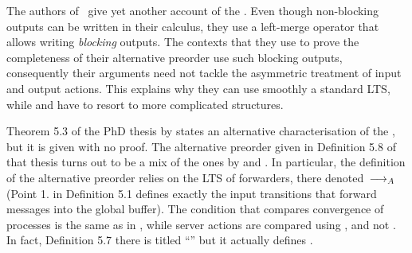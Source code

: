 



The authors of~\cite{DBLP:journals/tcs/NicolaP00} give yet another account of the \mustpreorder.
Even though non-blocking outputs can be written in their calculus,
they use a left-merge operator that allows writing {\em blocking} outputs.
The contexts that they use to prove the completeness of their
alternative preorder use such blocking outputs, consequently
their arguments need not tackle the asymmetric treatment of input and
output actions. This explains why they can use smoothly a standard
LTS, while \cite{DBLP:conf/fsttcs/CastellaniH98} and
\cite{DBLP:journals/iandc/BorealeNP02} have to resort to more
complicated structures.


Theorem 5.3 of the PhD thesis by \cite{DBLP:phd/us/Thati03} states an
alternative characterisation of the \mustpreorder, but it is given
with no proof.  The alternative preorder given in Definition 5.8 of
that thesis turns out to be a mix of the ones by
\cite{DBLP:conf/fsttcs/CastellaniH98} and
\cite{DBLP:journals/iandc/BorealeNP02}.  In particular, the
definition of the alternative preorder relies on the LTS of
forwarders, there denoted~$\mathrel{\overset{}\longrightarrow}_A$ (Point 1. in Definition 5.1
defines exactly the input transitions that forward messages into the
global buffer).  The condition that compares convergence of processes
is the same as in \cite{DBLP:conf/fsttcs/CastellaniH98}, while
server actions are compared using \MustSets, and not \AcceptanceSets.
In fact, Definition 5.7 there is titled ``\AcceptanceSets'' but it
actually defines \MustSets.






